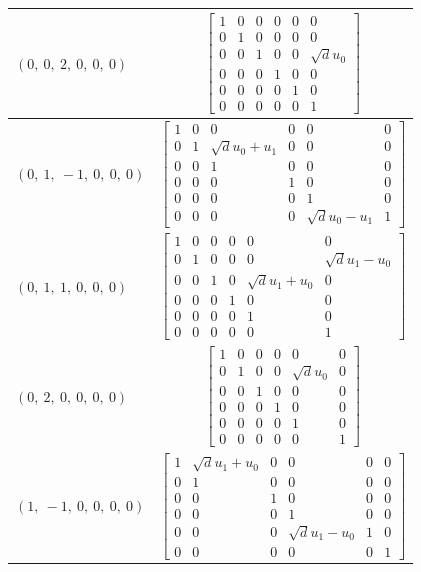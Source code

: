 \documentclass[11pt]{article}
\theoremstyle{definition}
\begin{document}
\begin{longtable}{|l|c|}
    \hline
    $\left( 0, \  0, \  2, \  0, \  0, \  0\right)$ & ${\left[\begin{matrix}1 & 0 & 0 & 0 & 0 & 0\\0 & 1 & 0 & 0 & 0 & 0\\0 & 0 & 1 & 0 & 0 & \sqrt{d} u_{0}\\0 & 0 & 0 & 1 & 0 & 0\\0 & 0 & 0 & 0 & 1 & 0\\0 & 0 & 0 & 0 & 0 & 1\end{matrix}\right]}$ \\
    \hline
    $\left( 0, \  1, \  -1, \  0, \  0, \  0\right)$ & ${\left[\begin{matrix}1 & 0 & 0 & 0 & 0 & 0\\0 & 1 & \sqrt{d} u_{0} + u_{1} & 0 & 0 & 0\\0 & 0 & 1 & 0 & 0 & 0\\0 & 0 & 0 & 1 & 0 & 0\\0 & 0 & 0 & 0 & 1 & 0\\0 & 0 & 0 & 0 & \sqrt{d} u_{0} - u_{1} & 1\end{matrix}\right]}$ \\
    \hline
    $\left( 0, \  1, \  1, \  0, \  0, \  0\right)$ & ${\left[\begin{matrix}1 & 0 & 0 & 0 & 0 & 0\\0 & 1 & 0 & 0 & 0 & \sqrt{d} u_{1} - u_{0}\\0 & 0 & 1 & 0 & \sqrt{d} u_{1} + u_{0} & 0\\0 & 0 & 0 & 1 & 0 & 0\\0 & 0 & 0 & 0 & 1 & 0\\0 & 0 & 0 & 0 & 0 & 1\end{matrix}\right]}$ \\
    \hline
    $\left( 0, \  2, \  0, \  0, \  0, \  0\right)$ & ${\left[\begin{matrix}1 & 0 & 0 & 0 & 0 & 0\\0 & 1 & 0 & 0 & \sqrt{d} u_{0} & 0\\0 & 0 & 1 & 0 & 0 & 0\\0 & 0 & 0 & 1 & 0 & 0\\0 & 0 & 0 & 0 & 1 & 0\\0 & 0 & 0 & 0 & 0 & 1\end{matrix}\right]}$ \\
    \hline
    $\left( 1, \  -1, \  0, \  0, \  0, \  0\right)$ & ${\left[\begin{matrix}1 & \sqrt{d} u_{1} + u_{0} & 0 & 0 & 0 & 0\\0 & 1 & 0 & 0 & 0 & 0\\0 & 0 & 1 & 0 & 0 & 0\\0 & 0 & 0 & 1 & 0 & 0\\0 & 0 & 0 & \sqrt{d} u_{1} - u_{0} & 1 & 0\\0 & 0 & 0 & 0 & 0 & 1\end{matrix}\right]}$ \\

\end{longtable}
\end{document}
